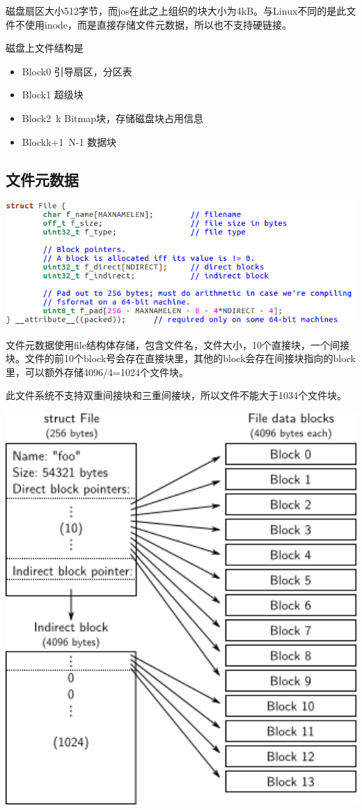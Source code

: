 磁盘扇区大小512字节，而jos在此之上组织的块大小为4kB。与Linux不同的是此文件不使用inode，而是直接存储文件元数据，所以也不支持硬链接。

磁盘上文件结构是

\begin{itemize}
\item Block0 引导扇区，分区表
\item Block1 超级块
\item Block2~k Bitmap块，存储磁盘块占用信息
\item Blockk+1~N-1 数据块
\end{itemize}

\subsection{文件元数据}

\includegraphics[width=6in]{figures/file/image109.png}

文件元数据使用file结构体存储，包含文件名，文件大小，10个直接块，一个间接块。文件的前10个block号会存在直接块里，其他的block会存在间接块指向的block里，可以额外存储4096/4=1024个文件块。

此文件系统不支持双重间接块和三重间接块，所以文件不能大于1034个文件块。

\includegraphics[width=6in]{figures/file/image110.png}

